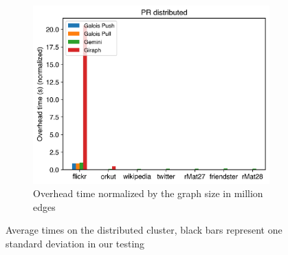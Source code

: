 \begin{figure}
\begin{subfigure}{0.3\textwidth}
		\includegraphics[width=\linewidth]{../../plots/distributedPR_overheadTimeNormalized.png}
		\caption{Overhead time normalized by the graph size in million edges}
		\label{fig:distributedPR_overheadNormalized}
	\end{subfigure}
	
	\caption{Average times on the distributed cluster, black bars represent one standard deviation in our testing}
\end{figure}










